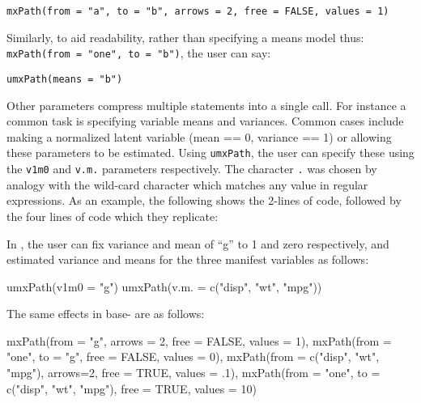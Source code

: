 \documentclass{article}
\newcommand{\code}[1]{\texttt{#1}}
\begin{document}
\code{mxPath(from = "a", to = "b", arrows = 2, free = FALSE, values = 1)}

Similarly, to aid readability, rather than specifying a means model thus: \code{ mxPath(from = "one", to = "b")}, the user can say:

\code{umxPath(means = "b")}

Other parameters compress multiple statements into a single call. For instance a common task is specifying variable means and variances. Common cases include making a normalized latent variable (mean == 0, variance == 1) or allowing these parameters to be estimated. Using \code{umxPath}, the user can specify these using the \code{v1m0} and \code{v.m.} parameters respectively. The character \code{.} was chosen by analogy with the wild-card character which matches any value in regular expressions. As an example, the following shows the 2-lines of  code, followed by the four lines of  code which they replicate:

In , the user can fix variance and mean of ``g'' to 1 and zero respectively, and estimated variance and means for the three manifest variables as follows:

\begin{CodeInput}
umxPath(v1m0 = "g") 
umxPath(v.m. = c("disp", "wt", "mpg"))
\end{CodeInput}

The same effects in base- are as follows:

\begin{CodeInput}
mxPath(from = "g", arrows = 2, free = FALSE, values = 1),
mxPath(from = "one", to =  "g", free = FALSE, values = 0),
mxPath(from = c("disp", "wt", "mpg"), arrows=2, free = TRUE, values = .1),
mxPath(from = "one", to =  c("disp", "wt", "mpg"), free = TRUE, values = 10)

\end{CodeInput}

\end{document}
